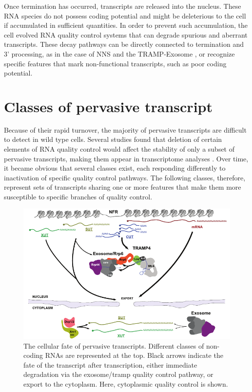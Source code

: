 Once termination has occurred, transcripts are released into the nucleus. 
These RNA species do not possess coding potential and might be deleterious to the cell if accumulated in sufficient quantities. 
In order to prevent such accumulation, the cell evolved RNA quality control systems that can degrade spurious and aberrant transcripts. 
These decay pathways can be directly connected to termination and 3’ processing, as in the case of NNS and the TRAMP-Exosome \cite{thiebaut:2006:transcription}, or recognize specific features that mark non-functional transcripts, such as poor coding potential.

\section{Classes of pervasive transcript} \label{pervasiveTranscripts}

Because of their rapid turnover, the majority of pervasive transcripts are difficult to detect in wild type cells. 
Several studies found that deletion of certain elements of RNA quality control would affect the stability of only a subset of pervasive transcripts, making them appear in transcriptome analyses \cite{wyers:2005:cryptic, vandijk:2011:xuts}. 
Over time, it became obvious that several classes exist, each responding differently to inactivation of specific quality control pathways. 
The following classes, therefore, represent sets of transcripts sharing one or more features that make them more susceptible to specific branches of quality control.

\begin{figure}[ht]

\centering
\includegraphics[width=\textwidth]{figures/introduction/pervasiveTr}
\caption[Classes of transcripts and their fates.]{The cellular fate of pervasive transcripts. Different classes of non-coding RNAs are represented at the top. Black arrows indicate the fate of the transcript after transcription, either immediate degradation via the exosome/\gls{tramp} quality control pathway, or export to the cytoplasm. Here, cytoplasmic quality control is shown.}
\label{fig:pervasiveTranscripts}

\end{figure}


